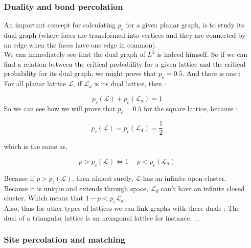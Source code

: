 \documentclass{article}
\begin{document}
\subsubsection{Duality and bond percolation}

An important concept for calculating $p_c$ for a given planar graph, is to study its dual graph (where faces are transformed into vertices and they are connected by an edge when the faces have one edge in common).\\
We can immediately see that the dual graph of $L^2$ is indeed himself. So if we can find a relation between the critical probability for a given lattice and the critical probability for its dual graph, we might prove that $p_c = 0.5$.
And there is one :\\

For all planar lattice $\mathscr{L}$, if $\mathscr{L}_d$ is its dual lattice, then :

$$p_c(\mathscr{L}) + p_c(\mathscr{L}_d) = 1$$
So we can see how we will prove that $p_c = 0.5$ for the square lattice, because :

$$p_c(\mathscr{L}) = p_c(\mathscr{L}_d) = \frac{1}{2}$$

which is the same as,

$$ p > p_c(\mathscr{L}) \Longleftrightarrow 1 - p < p_c(\mathscr{L}_d)$$

Because if $p > p_c(\mathscr{L})$, then almost surely, $\mathscr{L}$ has an infinite open cluster. Because it is unique and extends through space, $\mathscr{L}_d$ can't have an infinite closed cluster. Which means that $1 - p < p_c{\mathscr{L}_d}$ \\

Also, thus for other types of lattices we can link graphs with there duals :
The dual of a triangular lattice is an hexagonal lattice for instance.
...

\subsubsection{Site percolation and matching}
\end{document}
